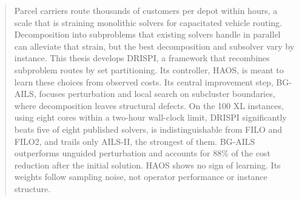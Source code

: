 \begin{abstract}\thispagestyle{scrheadings}
    Parcel carriers route thousands of customers per depot within hours, a scale that is straining monolithic solvers for capacitated vehicle routing. Decomposition into subproblems that existing solvers handle in parallel can alleviate that strain, but the best decomposition and subsolver vary by instance. This thesis develops DRISPI, a framework that recombines subproblem routes by set partitioning. Its controller, HAOS, is meant to learn these choices from observed costs. Its central improvement step, BG-AILS, focuses perturbation and local search on subcluster boundaries, where decomposition leaves structural defects. On the 100 XL instances, using eight cores within a two-hour wall-clock limit, DRISPI significantly beats five of eight published solvers, is indistinguishable from FILO and FILO2, and trails only AILS-II, the strongest of them. BG-AILS outperforms unguided perturbation and accounts for 88\% of the cost reduction after the initial solution. HAOS shows no sign of learning. Its weights follow sampling noise, not operator performance or instance structure.
\end{abstract}